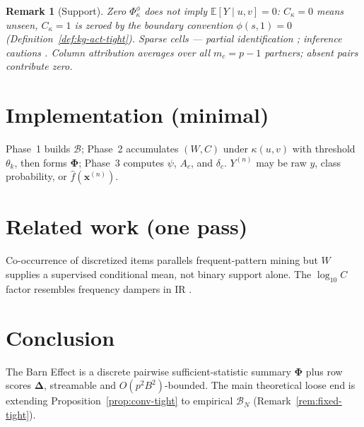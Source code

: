 \documentclass[11pt]{article}
\newtheorem{remark}{Remark}
\begin{document}
\begin{remark}[Support]
Zero $\Phi^\phi_\kappa$ does not imply $\mathbb{E}[Y\mid u,v]=0$: $C_\kappa=0$ means unseen, $C_\kappa=1$ is zeroed by the boundary convention $\phi(s,1)=0$ (Definition~\ref{def:kg-act-tight}).
Sparse cells --- partial identification \cite{Manski2003}; inference cautions \cite{Agresti2013}.
Column attribution averages over all $m_c=p-1$ partners; absent pairs contribute zero.
\end{remark}

\section{Implementation (minimal)}
Phase~1 builds $\mathcal{B}$; Phase~2 accumulates $(W,C)$ under $\kappa(u,v)$ with threshold $\theta_k$, then forms $\bm{\Phi}$; Phase~3 computes $\psi$, $A_c$, and $\delta_c$.
$Y^{(n)}$ may be raw $y$, class probability, or $\hat f(\bm{x}^{(n)})$.

\section{Related work (one pass)}
Co-occurrence of discretized items parallels frequent-pattern mining \cite{Agrawal1994} but $W$ supplies a supervised conditional mean, not binary support alone.
The $\log_{10} C$ factor resembles frequency dampers in IR \cite{SparckJones1972}.

\section*{Conclusion}
The Barn Effect is a discrete pairwise sufficient-statistic summary $\bm{\Phi}$ plus row scores $\bm{\Delta}$, streamable and $O(p^2B^2)$-bounded.
The main theoretical loose end is extending Proposition~\ref{prop:conv-tight} to empirical $\mathcal{B}_N$ (Remark~\ref{rem:fixed-tight}).
\end{document}
